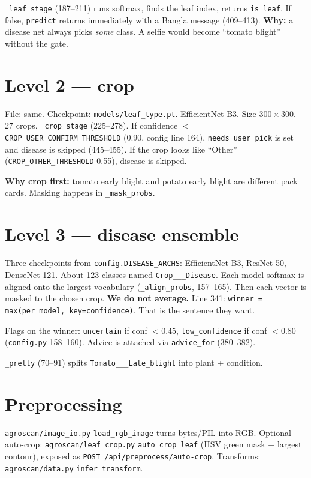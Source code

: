 \documentclass[Times,11pt,oneside,openany]{report}
\begin{document}
\texttt{\_leaf\_stage} (187--211) runs softmax, finds the leaf index, returns \texttt{is\_leaf}. If false, \texttt{predict} returns immediately with a Bangla message (409--413). \textbf{Why:} a disease net always picks \emph{some} class. A selfie would become ``tomato blight'' without the gate.

\section{Level 2 --- crop}
File: same. Checkpoint: \texttt{models/leaf\_type.pt}. EfficientNet-B3. Size $300\times300$. 27 crops. \texttt{\_crop\_stage} (225--278). If confidence $<$ \texttt{CROP\_USER\_CONFIRM\_THRESHOLD} (0.90, config line 164), \texttt{needs\_user\_pick} is set and disease is skipped (445--455). If the crop looks like ``Other'' (\texttt{CROP\_OTHER\_THRESHOLD} 0.55), disease is skipped.

\textbf{Why crop first:} tomato early blight and potato early blight are different pack cards. Masking happens in \texttt{\_mask\_probs}.

\section{Level 3 --- disease ensemble}
Three checkpoints from \texttt{config.DISEASE\_ARCHS}: EfficientNet-B3, ResNet-50, DenseNet-121. About 123 classes named \texttt{Crop\_\_\_Disease}. Each model softmax is aligned onto the largest vocabulary (\texttt{\_align\_probs}, 157--165). Then each vector is masked to the chosen crop. \textbf{We do not average.} Line 341: \texttt{winner = max(per\_model, key=confidence)}. That is the sentence they want.

Flags on the winner: \texttt{uncertain} if conf $< 0.45$, \texttt{low\_confidence} if conf $< 0.80$ (\texttt{config.py} 158--160). Advice is attached via \texttt{advice\_for} (380--382).

\texttt{\_pretty} (70--91) splits \texttt{Tomato\_\_\_Late\_blight} into plant + condition.

\section{Preprocessing}
\texttt{agroscan/image\_io.py} \texttt{load\_rgb\_image} turns bytes/PIL into RGB. Optional auto-crop: \texttt{agroscan/leaf\_crop.py} \texttt{auto\_crop\_leaf} (HSV green mask + largest contour), exposed as \texttt{POST /api/preprocess/auto-crop}. Transforms: \texttt{agroscan/data.py} \texttt{infer\_transform}.
\end{document}
